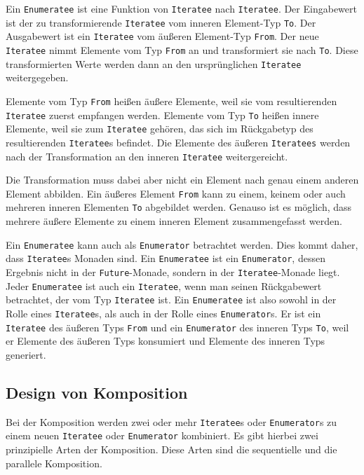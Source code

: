 Ein \lstinline|Enumeratee| ist eine Funktion von \lstinline|Iteratee| nach \lstinline|Iteratee|.
Der Eingabewert ist der zu transformierende \lstinline|Iteratee| vom inneren Element-Typ \lstinline|To|.
Der Ausgabewert ist ein \lstinline|Iteratee| vom äußeren Element-Typ \lstinline|From|.
Der neue \lstinline|Iteratee| nimmt Elemente vom Typ \lstinline|From| an und transformiert sie nach \lstinline|To|.
Diese transformierten Werte werden dann an den ursprünglichen \lstinline|Iteratee| weitergegeben.

Elemente vom Typ \lstinline|From| heißen äußere Elemente, weil sie vom resultierenden \lstinline|Iteratee| zuerst empfangen werden.
Elemente vom Typ \lstinline|To| heißen innere Elemente, weil sie zum \lstinline|Iteratee| gehören, das sich im Rückgabetyp des resultierenden \lstinline|Iteratee|s befindet.
Die Elemente des äußeren \lstinline|Iteratees| werden nach der Transformation an den inneren \lstinline|Iteratee| weitergereicht.

Die Transformation muss dabei aber nicht ein Element nach genau einem anderen Element abbilden.
Ein äußeres Element \lstinline|From| kann zu einem, keinem oder auch mehreren inneren Elementen \lstinline|To| abgebildet werden.
Genauso ist es möglich, dass mehrere äußere Elemente zu einem inneren Element zusammengefasst werden.

Ein \lstinline|Enumeratee| kann auch als \lstinline|Enumerator| betrachtet werden.
Dies kommt daher, dass \lstinline|Iteratee|s Monaden sind.
Ein \lstinline|Enumeratee| ist ein \lstinline|Enumerator|, dessen Ergebnis nicht in der \lstinline|Future|-Monade, sondern in der \lstinline|Iteratee|-Monade liegt.
Jeder \lstinline|Enumeratee| ist auch ein \lstinline|Iteratee|, wenn man seinen Rückgabewert betrachtet, der vom Typ \lstinline|Iteratee| ist.
Ein \lstinline|Enumeratee| ist also sowohl in der Rolle eines \lstinline|Iteratee|s, als auch in der Rolle eines \lstinline|Enumerator|s.
Er ist ein \lstinline|Iteratee| des äußeren Typs \lstinline|From| und ein \lstinline|Enumerator| des inneren Typs \lstinline|To|, weil er Elemente des äußeren Typs konsumiert und Elemente des inneren Typs generiert.



\subsection{Design von Komposition} %
\label{sub:komposition}

Bei der Komposition werden zwei oder mehr \lstinline|Iteratee|s oder \lstinline|Enumerator|s zu einem neuen \lstinline|Iteratee| oder \lstinline|Enumerator| kombiniert.
Es gibt hierbei zwei prinzipielle Arten der Komposition.
Diese Arten sind die sequentielle und die parallele Komposition.

